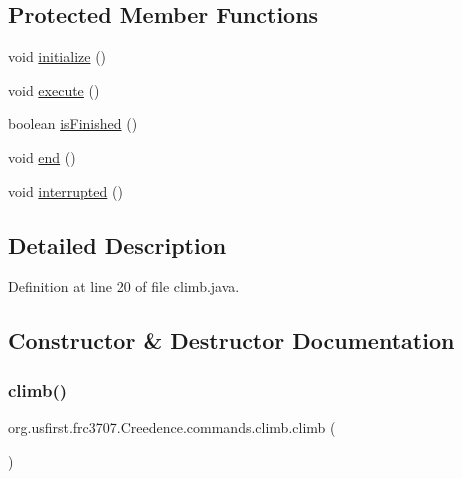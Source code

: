 \subsection*{Protected Member Functions}
\begin{DoxyCompactItemize}
\item 
void \mbox{\hyperlink{classorg_1_1usfirst_1_1frc3707_1_1_creedence_1_1commands_1_1climb_a5f969c3075f72197abc2583f68d6a912}{initialize}} ()
\item 
void \mbox{\hyperlink{classorg_1_1usfirst_1_1frc3707_1_1_creedence_1_1commands_1_1climb_a4c45e008bedbc5630abc5c9fc6d54410}{execute}} ()
\item 
boolean \mbox{\hyperlink{classorg_1_1usfirst_1_1frc3707_1_1_creedence_1_1commands_1_1climb_abbbaa3ec3cfc2cb152b04d01911eeac4}{is\+Finished}} ()
\item 
void \mbox{\hyperlink{classorg_1_1usfirst_1_1frc3707_1_1_creedence_1_1commands_1_1climb_a751add8652ded748394030bf97eb0d1a}{end}} ()
\item 
void \mbox{\hyperlink{classorg_1_1usfirst_1_1frc3707_1_1_creedence_1_1commands_1_1climb_a7dce1e7b5e9183b0ffd5c6faa11e3c85}{interrupted}} ()
\end{DoxyCompactItemize}


\subsection{Detailed Description}


Definition at line 20 of file climb.\+java.



\subsection{Constructor \& Destructor Documentation}
\mbox{\label{classorg_1_1usfirst_1_1frc3707_1_1_creedence_1_1commands_1_1climb_ab3ba6a9b468e18a358e68d8c05fac1ba}} 
\subsubsection{\texorpdfstring{climb()}{climb()}}
{\footnotesize\ttfamily org.\+usfirst.\+frc3707.\+Creedence.\+commands.\+climb.\+climb (\begin{DoxyParamCaption}{ }\end{DoxyParamCaption})}



